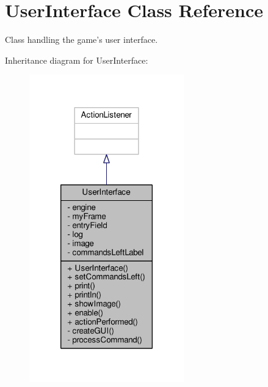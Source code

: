 \hypertarget{classUserInterface}{\section{User\-Interface Class Reference}
\label{classUserInterface}
}


Class handling the game's user interface.  




Inheritance diagram for User\-Interface\-:\nopagebreak
\begin{figure}[H]
\begin{center}
\leavevmode
\includegraphics[width=190pt]{classUserInterface__inherit__graph}
\end{center}
\end{figure}


